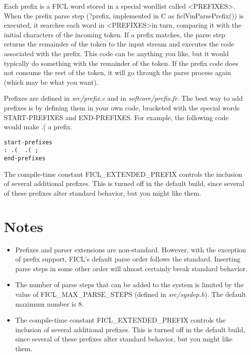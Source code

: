 Each prefix is a FICL word stored in a special wordlist called
\textless PREFIXES\textgreater . When the prefix parse step (?prefix,
implemented in C as ficlVmParsePrefix()) is executed, it searches each
word in \textless PREFIXES\textgreater  in turn, comparing it with the
initial characters of the incoming token. If a prefix matches, the parse
step returns the remainder of the token to the input stream and executes
the code associated with the prefix. This code can be anything you like,
but it would typically do something with the remainder of the token. If
the prefix code does not consume the rest of the token, it will go
through the parse process again (which may be what you want).

Prefixes are defined in \textit{src/prefix.c} and in
\textit{softcore/prefix.fr}. The best way to add prefixes is by defining
them in your own code, bracketed with the special words START-PREFIXES
and END-PREFIXES. For example, the following code would make .( a prefix.
\begin{lstlisting}[frame=single]
start-prefixes
: .(  .( ;
end-prefixes
\end{lstlisting}
The compile-time constant FICL\_EXTENDED\_PREFIX controls the inclusion
of several additional prefixes. This is turned off in the default build,
since several of these prefixes alter standard behavior, but you might
like them.


\section{Notes}
\begin{itemize}[noitemsep]
	\item Prefixes and parser extensions are non-standard. However,
	with the exception of prefix support, FICL's default parse order
	follows the standard. Inserting parse steps in some other order
	will almost certainly break standard behavior.

	\item The number of parse steps that can be added to the system
	is limited by the value of FICL\_MAX\_PARSE\_STEPS (defined in
	\textit{src/sysdep.h}). The default maximum number is 8.

	\item The compile-time constant FICL\_EXTENDED\_PREFIX controls
	the inclusion of several additional prefixes. This is turned off
	in the default build, since several of these prefixes alter
	standard behavior, but you might like them.
\end{itemize}


